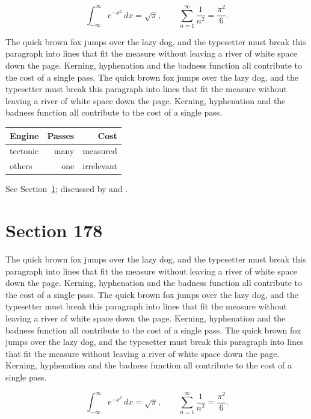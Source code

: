 \documentclass{article}
\begin{document}
\begin{equation}\label{eq:177}
\int_{-\infty}^{\infty} e^{-x^{2}}\,dx = \sqrt{\pi}, \qquad
\sum_{n=1}^{\infty} \frac{1}{n^{2}} = \frac{\pi^{2}}{6}.
\end{equation}

The quick brown fox jumps over the lazy dog, and the typesetter must break this paragraph into lines that fit the measure without leaving a river of white space down the page. Kerning, hyphenation and the badness function all contribute to the cost of a single pass. The quick brown fox jumps over the lazy dog, and the typesetter must break this paragraph into lines that fit the measure without leaving a river of white space down the page. Kerning, hyphenation and the badness function all contribute to the cost of a single pass. 

\begin{center}
\begin{tabular}{lrr}
\toprule
Engine & Passes & Cost \\
\midrule
tectonic & many & measured \\
others & one & irrelevant \\
\bottomrule
\end{tabular}
\end{center}

See Section~\ref{sec:178}; discussed by \textcite{k3} and \textcite{l5}.
\section{Section 178}
\label{sec:178}
The quick brown fox jumps over the lazy dog, and the typesetter must break this paragraph into lines that fit the measure without leaving a river of white space down the page. Kerning, hyphenation and the badness function all contribute to the cost of a single pass. The quick brown fox jumps over the lazy dog, and the typesetter must break this paragraph into lines that fit the measure without leaving a river of white space down the page. Kerning, hyphenation and the badness function all contribute to the cost of a single pass. The quick brown fox jumps over the lazy dog, and the typesetter must break this paragraph into lines that fit the measure without leaving a river of white space down the page. Kerning, hyphenation and the badness function all contribute to the cost of a single pass. 

\begin{equation}\label{eq:178}
\int_{-\infty}^{\infty} e^{-x^{2}}\,dx = \sqrt{\pi}, \qquad
\sum_{n=1}^{\infty} \frac{1}{n^{2}} = \frac{\pi^{2}}{6}.
\end{equation}
\end{document}

